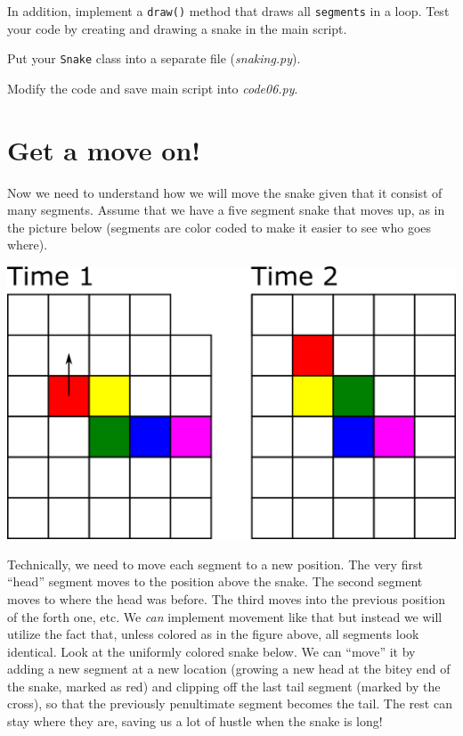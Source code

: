 \documentclass[
]{book}
\begin{document}
In addition, implement a \texttt{draw()} method that draws all \texttt{segments} in a loop. Test your code by creating and drawing a snake in the main script.

Put your \texttt{Snake} class into a separate file (\emph{snaking.py}).

Modify the code and save main script into \emph{code06.py}.

\hypertarget{get-a-move-on}{%
\section{Get a move on!}\label{get-a-move-on}}

Now we need to understand how we will move the snake given that it consist of many segments. Assume that we have a five segment snake that moves up, as in the picture below (segments are color coded to make it easier to see who goes where).

\includegraphics[width=14.36in]{images/snake-movement}

Technically, we need to move each segment to a new position. The very first ``head'' segment moves to the position above the snake. The second segment moves to where the head was before. The third moves into the previous position of the forth one, etc. We \emph{can} implement movement like that but instead we will utilize the fact that, unless colored as in the figure above, all segments look identical. Look at the uniformly colored snake below. We can ``move'' it by adding a new segment at a new location (growing a new head at the bitey end of the snake, marked as red) and clipping off the last tail segment (marked by the cross), so that the previously penultimate segment becomes the tail. The rest can stay where they are, saving us a lot of hustle when the snake is long!
\end{document}
